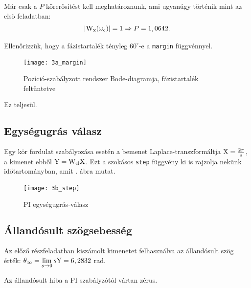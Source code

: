 Már csak a $P$ körerősítést kell meghatároznunk, ami ugyanúgy történik mint az első feladatban:
\begin{equation}
	\left\lvert \mathrm{W}_\text{x}(\omega_\text{c}) \right\rvert = 1 \Rightarrow P = 1,0642.
\end{equation}

Ellenőrizzük, hogy a fázistartalék tényleg $60^\circ$-e a \verb|margin| függvénnyel.
\begin{figure}[H]
	\centering
	\texttt{[image: 3a\_margin]}
	\caption{Pozíció-szabályzott rendszer Bode-diagramja, fázistartalék feltüntetve}
	\label{fig:3a_margin}
\end{figure}

Ez teljesül.


\subsection{Egységugrás válasz}

Egy kör fordulat szabályozása esetén a bemenet Laplace-transzformáltja $\mathrm{X}=\frac{2\pi}{s}$,
a kimenet ebből $\mathrm{Y} = \mathrm{W}_\text{cl}\mathrm{X}$. Ezt a szokásos \verb|step| függvény
ki is rajzolja nekünk időtartományban, amit . ábra mutat.

\begin{figure}[H]
	\centering
	\texttt{[image: 3b\_step]}
	\caption{PI egységugrás-válasz}
	\label{fig:3b_step}
\end{figure}


\subsection{Állandósult szögsebesség}

Az előző részfeladatban kiszámolt kimenetet felhasználva az állandósult szög érték:
$\theta_\infty = \lim\limits_{s\rightarrow 0}s\mathrm{Y} = 6,2832$ rad.

Az állandósult hiba a PI szabályzótól vártan zérus.

